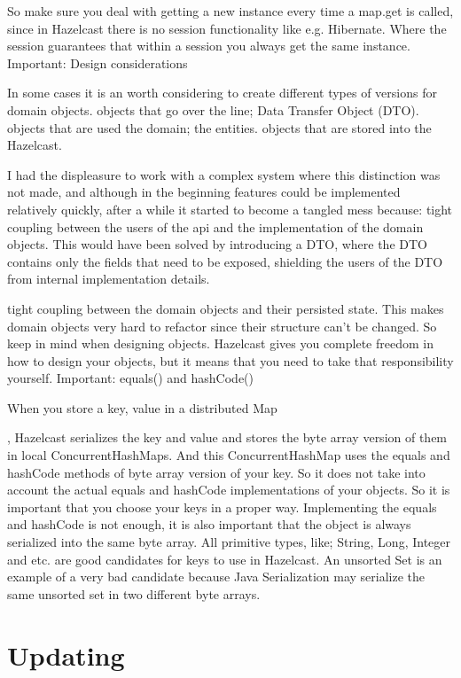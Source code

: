So make sure you deal with getting a new instance every time a map.get is called, since in Hazelcast there is no session functionality like e.g. Hibernate. Where the session guarantees that within a session you always get the same instance. 
Important: Design considerations

In some cases it is an worth considering to create different types of versions for domain objects.
objects that go over the line; Data Transfer Object (DTO).
objects that are used the domain; the entities.
objects that are stored into the Hazelcast.

I had the displeasure to work with a complex system where this distinction was not made, and although in the beginning features could be implemented relatively quickly, after a while it started to become a tangled mess because:
tight coupling between the users of the api and the implementation of the domain objects. This would have been solved by introducing a DTO, where the DTO contains only the fields that need to be exposed, shielding the users of the DTO from internal implementation details.

tight coupling between the domain objects and their persisted state. This makes domain objects very hard to refactor since their structure can't be changed.
So keep in mind when designing objects. Hazelcast gives you complete freedom in how to design your objects, but it means that you need to take that responsibility yourself.
Important: equals() and hashCode()

When you store a key, value in a distributed Map

, Hazelcast serializes the key and value and stores the byte array version of them in local ConcurrentHashMaps. And this ConcurrentHashMap uses the equals and hashCode methods of byte array version of your key. So it does not take into account the actual equals and hashCode implementations of your objects. So it is important that you choose your keys in a proper way. Implementing the equals and hashCode is not enough, it is also important that the object is always serialized into the same byte array. All primitive types, like; String, Long, Integer and etc. are good candidates for keys to use in Hazelcast. An unsorted Set is an example of a very bad candidate because Java Serialization may serialize the same unsorted set in two different byte arrays.

\section{Updating}

